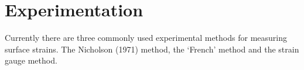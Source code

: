 \section{Experimentation}
Currently there are three commonly used experimental methods for measuring
surface strains. The Nicholson (1971) method, the `French' method and the strain
gauge method.